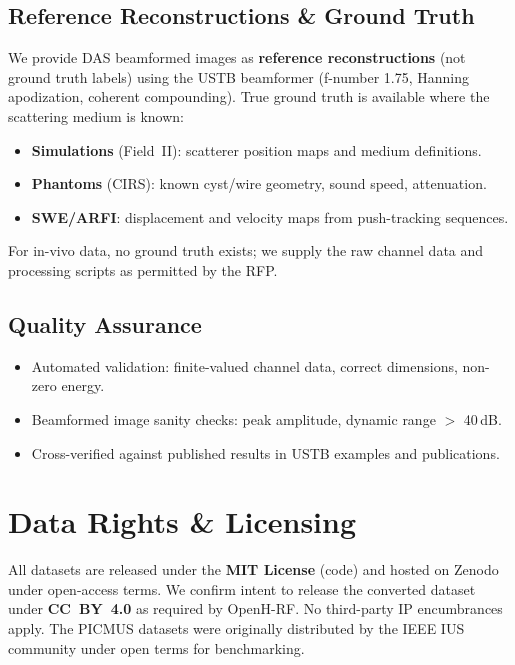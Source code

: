 \documentclass[11pt,a4paper]{article}
\begin{document}
\subsection*{Reference Reconstructions \& Ground Truth}
We provide DAS beamformed images as \textbf{reference reconstructions} (not ground truth labels) using the USTB beamformer (f-number 1.75, Hanning apodization, coherent compounding).
True ground truth is available where the scattering medium is known:
\begin{itemize}[nosep]
  \item \textbf{Simulations} (Field~II): scatterer position maps and medium definitions.
  \item \textbf{Phantoms} (CIRS): known cyst/wire geometry, sound speed, attenuation.
  \item \textbf{SWE/ARFI}: displacement and velocity maps from push-tracking sequences.
\end{itemize}
For in-vivo data, no ground truth exists; we supply the raw channel data and processing scripts as permitted by the RFP.

\subsection*{Quality Assurance}
\begin{itemize}[nosep]
  \item Automated validation: finite-valued channel data, correct dimensions, non-zero energy.
  \item Beamformed image sanity checks: peak amplitude, dynamic range $>$ 40\,dB.
  \item Cross-verified against published results in USTB examples and publications.
\end{itemize}

\section{Data Rights \& Licensing}

All datasets are released under the \textbf{MIT License} (code) and hosted on Zenodo under open-access terms.
We confirm intent to release the converted dataset under \textbf{CC~BY~4.0} as required by OpenH-RF.
No third-party IP encumbrances apply.
The PICMUS datasets were originally distributed by the IEEE IUS community under open terms for benchmarking.

\end{document}
